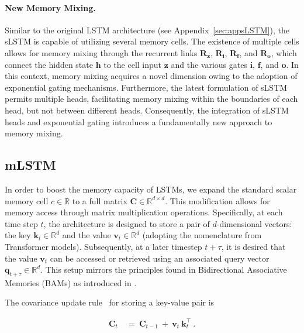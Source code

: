 \paragraph{New Memory Mixing.} Similar to the original LSTM architecture (see Appendix~\ref{sec:appsLSTM}), the sLSTM is capable of utilizing several memory cells. The existence of multiple cells allows for memory mixing through the recurrent links $\mathbf{R}_{\mathbf{z}}$, $\mathbf{R}_{\mathbf{i}}$, $\mathbf{R}_{\mathbf{f}}$, and $\mathbf{R}_{\mathbf{o}}$, which connect the hidden state $\mathbf{h}$ to the cell input $\mathbf{z}$ and the various gates $\mathbf{i}$, $\mathbf{f}$, and $\mathbf{o}$. In this context, memory mixing acquires a novel dimension owing to the adoption of exponential gating mechanisms. Furthermore, the latest formulation of sLSTM permits multiple heads, facilitating memory mixing within the boundaries of each head, but not between different heads. Consequently, the integration of sLSTM heads and exponential gating introduces a fundamentally new approach to memory mixing.

\subsection{mLSTM}
\label{sec:mLSTM}

In order to boost the memory capacity of LSTMs, we expand the standard scalar memory cell $c \in \mathbb{R}$ to a full matrix $\mathbf{C} \in \mathbb{R}^{d \times d}$. This modification allows for memory access through matrix multiplication operations. Specifically, at each time step $t$, the architecture is designed to store a pair of $d$-dimensional vectors: the key $\mathbf{k}_t \in \mathbb{R}^d$ and the value $\mathbf{v}_t \in \mathbb{R}^d$ (adopting the nomenclature from Transformer models). Subsequently, at a later timestep $t + \tau$, it is desired that the value $\mathbf{v}_t$ can be accessed or retrieved using an associated query vector $\mathbf{q}_{t+\tau} \in \mathbb{R}^d$. This setup mirrors the principles found in Bidirectional Associative Memories (BAMs) as introduced in \citep{Kohonen:72,Anderson:72,Nakano:72,Anderson:77}.

The covariance update rule~\citep{Sejnowski:77,Dayan:91} for storing a key-value pair is

\begin{align}
\mathbf{C}_t \ &= \ \mathbf{C}_{t-1} \ + \ \mathbf{v}_{t} \ \mathbf{k}_t^\top \ .
\end{align}

